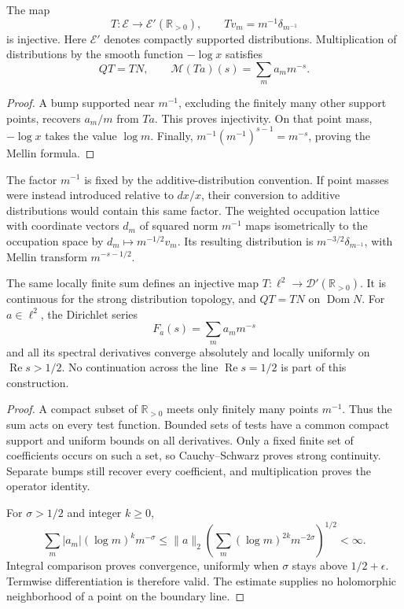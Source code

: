 \begin{proposition}
\label{mo:occupation}
The map
\begin{equation}
 T:\mathscr E\longrightarrow\mathscr E'(\mathbb R_{>0}),
 \qquad Tv_m=m^{-1}\delta_{m^{-1}}
 \label{mo:embedding}
\end{equation}
is injective. Here $\mathscr E'$ denotes compactly supported
distributions. Multiplication of distributions by the smooth
function $-\log x$ satisfies
\[
 QT=TN,\qquad
 \mathcal M(Ta)(s)=\sum_m a_m m^{-s}.
\]
\end{proposition}
\begin{proof}
A bump supported near $m^{-1}$, excluding the finitely many other
support points, recovers $a_m/m$ from $Ta$. This proves injectivity.
On that point mass, $-\log x$ takes the value $\log m$.
Finally,
$m^{-1}(m^{-1})^{s-1}=m^{-s}$, proving the Mellin formula.
\end{proof}

The factor $m^{-1}$ is fixed by the additive-distribution convention.
If point masses were instead introduced relative to $dx/x$, their
conversion to additive distributions would contain this same factor.
The weighted occupation lattice with coordinate vectors $d_m$ of
squared norm $m^{-1}$ maps isometrically to the occupation space by
$d_m\mapsto m^{-1/2}v_m$. Its resulting distribution is
$m^{-3/2}\delta_{m^{-1}}$, with Mellin transform $m^{-s-1/2}$.

\begin{proposition}
\label{mo:dirichlet-domain}
The same locally finite sum defines an injective map
$T:\ell^2\to\mathscr D'(\mathbb R_{>0})$. It is continuous for
the strong distribution topology, and $QT=TN$ on
$\operatorname{Dom}N$. For $a\in\ell^2$, the Dirichlet series
\[
 F_a(s)=\sum_m a_m m^{-s}
\]
and all its spectral derivatives converge absolutely and locally
uniformly on $\operatorname{Re}s>1/2$. No continuation across the
line $\operatorname{Re}s=1/2$ is part of this construction.
\end{proposition}
\begin{proof}
A compact subset of $\mathbb R_{>0}$ meets only finitely many points
$m^{-1}$. Thus the sum acts on every test function. Bounded sets
of tests have a common compact support and uniform bounds on all
derivatives. Only a fixed finite set of coefficients occurs on such
a set, so Cauchy--Schwarz proves strong continuity. Separate bumps
still recover every coefficient, and multiplication proves the
operator identity.

For $\sigma>1/2$ and integer $k\geq0$,
\[
 \sum_m |a_m|(\log m)^k m^{-\sigma}
 \leq\|a\|_2
 \left(\sum_m(\log m)^{2k}m^{-2\sigma}\right)^{1/2}<\infty.
\]
Integral comparison proves convergence, uniformly when $\sigma$
stays above $1/2+\epsilon$. Termwise differentiation is therefore
valid. The estimate supplies no holomorphic neighborhood of a
point on the boundary line.
\end{proof}

